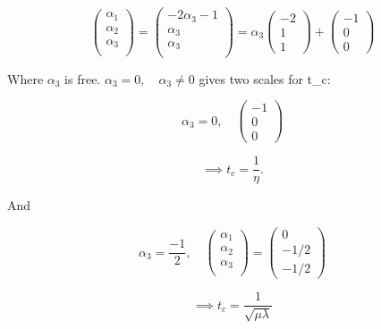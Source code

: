 \documentclass[12pt]{article}
\begin{document}
\begin{equation}
  \begin{pmatrix}
    \alpha_1 \\ \alpha_2 \\\alpha_3 \\
  \end{pmatrix}
  =
  \begin{pmatrix}
    -2\alpha_3-1 \\ \alpha_3 \\\alpha_3 \\
  \end{pmatrix}
  = \alpha_3
  \begin{pmatrix}
    -2 \\ 1 \\ 1
  \end{pmatrix}
  +
  \begin{pmatrix}
    -1 \\ 0 \\ 0
  \end{pmatrix}
\end{equation}

Where $\alpha_3$ is free. $\alpha_3=0, \quad \alpha_3\ne0$ gives two scales for
t\_c:

\begin{equation}
  \alpha_3=0, \quad
  \begin{pmatrix}
    -1 \\ 0 \\ 0
  \end{pmatrix}
\end{equation}

\begin{equation}
  \implies t_c = \frac{1}{\eta}.
\end{equation}

And

\begin{equation}
  \alpha_3 = \frac{-1}{2}, \quad
  \begin{pmatrix}
    \alpha_1 \\ \alpha_2 \\ \alpha_3 \\
  \end{pmatrix}
  =
  \begin{pmatrix}
    0 \\ -1/2 \\ -1/2
  \end{pmatrix}
\end{equation}

\begin{equation}
  \implies t_c = \frac{1}{\sqrt{\mu\lambda}}
\end{equation}
\end{document}

